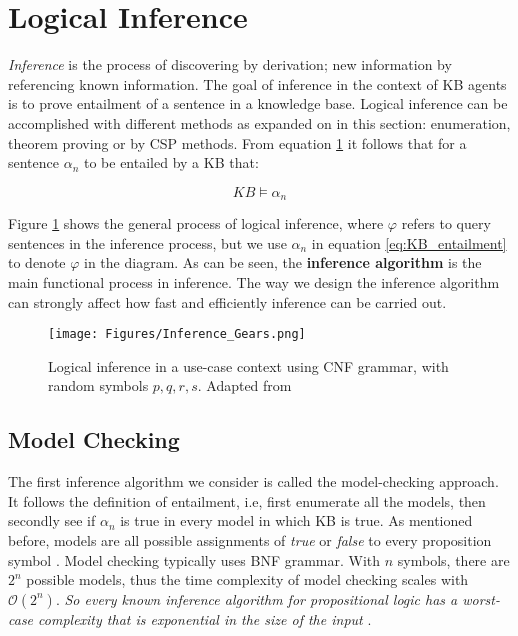 


\section{Logical Inference}
\label{sec:logical_inference}
\textit{Inference} is the process of discovering by derivation; new information by referencing known information. The goal of inference in the context of KB agents is to prove entailment of a sentence in a knowledge base. Logical inference can be accomplished with different methods as expanded on in this section: enumeration, theorem proving or by CSP methods. From equation \ref{fig:entailment} it follows that for a sentence $\alpha_n$ to be entailed by a KB that:

\begin{equation}
	KB \models \alpha_n
	\label{eq:KB_entailment}
\end{equation}

Figure \ref{fig:entailment} shows the general process of logical inference, where $\varphi$ refers to query sentences in the inference process, but we use $\alpha_n$ in equation \ref{eq:KB_entailment} to denote $\varphi$ in the diagram. As can be seen, the \textbf{inference algorithm} is the main functional process in inference. The way we design the inference algorithm can strongly affect how fast and efficiently inference can be carried out. 

\begin{figure}[H]
    \centering
    \texttt{[image: Figures/Inference\_Gears.png]}
    \caption{Logical inference in a use-case context using CNF grammar, with random symbols $p,q,r,s$. Adapted from \cite{10.1007/978-3-030-21077-9_32}}
    \label{fig:entailment}
\end{figure}




\subsection{Model Checking}

The first inference algorithm we consider is called the model-checking approach. It follows the definition of entailment, i.e, first enumerate all the models, then secondly see if $\alpha_n$ is true in every model in which KB is true. As mentioned before, models are all possible assignments of \textit{true} or \textit{false} to every proposition symbol \citep{russell2016artificial}. Model checking typically uses BNF grammar. With $n$ symbols, there are $2^n$ possible models, thus the time complexity of model checking scales with $\mathcal{O}(2^n)$. \textit{So every known inference algorithm for propositional logic has a worst-case complexity that is exponential in the size of the input} \citep{russell2016artificial}.\\


